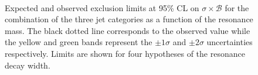 \begin{figure}[htb]
\centering
{}
\\
\caption{
    Expected and observed exclusion limits at 95\% CL on $\sigma\times\mathcal{B}$ for the combination of the three jet categories as a function of the resonance mass. The black dotted line corresponds to the observed value while the yellow and green bands represent the $\pm 1 \sigma$ and $\pm 2 \sigma$ uncertainties respectively. Limits are shown for four hypotheses of the resonance decay width.}
    \label{fig:13TeVcombobslim}
\end{figure}












